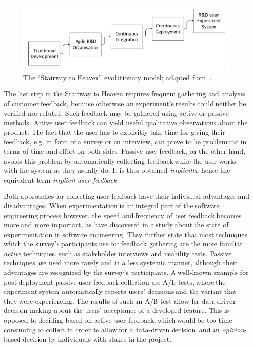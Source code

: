\begin{figure}[ht]
        \includegraphics[width=\textwidth]{gfx/stairway.pdf}
        \caption{The ``Stairway to Heaven'' evolutionary model; adapted from~\cite{Olsson2012}.}
        \label{fig:stairway}
\end{figure}

The last step in the Stairway to Heaven requires frequent gathering and analysis of customer feedback, because otherwise an experiment's results could neither be verified nor refuted.
Such feedback may be gathered using active or passive methods.
Active user feedback can yield useful qualitative observations about the product.
The fact that the user has to explicitly take time for giving their feedback, e.g. in form of a survey or an interview, can prove to be problematic in terms of time and effort on both sides.
Passive user feedback, on the other hand, avoids this problem by automatically collecting feedback while the user works with the system as they usually do.
It is thus obtained \emph{implicitly}, hence the equivalent term \emph{implicit user feedback}.

Both approaches for collecting user feedback have their individual advantages and disadvantages.
When experimentation is an integral part of the software engineering process however, the speed and frequency of user feedback becomes more and more important, as \citet{lindgren2015software} have discovered in a study about the state of experimentation in software engineering.
They further state that most techniques which the survey's participants use for feedback gathering are the more familiar \emph{active} techniques, such as stakeholder interviews and usability tests.
Passive techniques are used more rarely and in a less systemic manner, although their advantages are recognized by the survey's participants.
A well-known example for post-deployment passive user feedback collection are A/B tests, where the experiment system automatically reports users' decisions and the variant that they were experiencing.
The results of such an A/B test allow for data-driven decision making about the users' acceptance of a developed feature.
This is opposed to deciding based on active user feedback, which would be too time-consuming to collect in order to allow for a data-driven decision, and an \emph{opinion}-based decision by individuals with stakes in the project.

